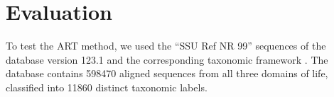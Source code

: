 
\section{Evaluation}
\label{ch:AutomaticTrees:sec:Evaluation}



To test the \acf{ART} method,
we used the ``SSU Ref NR 99'' sequences of the  database \citep{Quast2013} version 123.1
and the corresponding taxonomic framework \citep{Yilmaz2014}.
The database contains \num{598 470} aligned sequences from all three domains of life,
classified into \num{11 860} distinct taxonomic labels.

